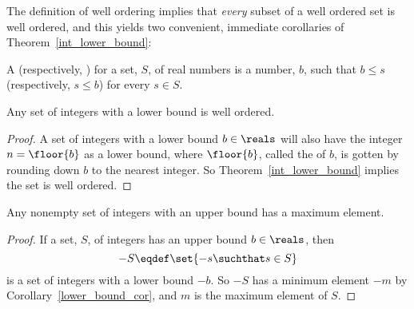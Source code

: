 The definition of well ordering implies that \emph{every} subset of a
well ordered set is well ordered, and this yields two convenient,
immediate corollaries of Theorem~\ref{int_lower_bound}:

\begin{definition}
A  (respectively, ) for a set,
$S$, of real numbers is a number, $b$, such that $b \leq s$
(respectively, $s \leq b$) for every $s \in S$.
\end{definition}

\begin{corollary}\label{lower_bound_cor}
Any set of integers with a lower bound is well ordered.
\end{corollary}

\begin{proof}
A set of integers with a lower bound $b \in \reals$ will also have the
integer $n = \floor{b}$ as a lower bound, where $\floor{b}$, called
the  of $b$, is gotten by rounding down $b$ to the nearest
integer.  So Theorem~\ref{int_lower_bound} implies the set is well
ordered.
\end{proof}


\begin{corollary}\label{upper_bound_cor}
Any nonempty set of integers with an upper bound has a maximum
element.
\end{corollary}

\begin{proof}
If a set, $S$, of integers has an upper bound $b \in \reals$, then
\[
- S \eqdef \set{ - s \suchthat s \in S}
\]
is a set of integers with a lower bound $-b$.  So $-S$ has a minimum
element $-m$ by Corollary~\ref{lower_bound_cor}, and $m$ is the
maximum element of $S$.
\end{proof}


